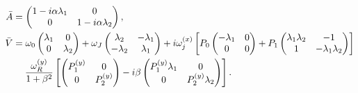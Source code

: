 \begin{subequations}
\begin{align}
    \bar{A} &=
    \begin{pmatrix}
     1-i\alpha\lambda_1 & 0 \\
     0 & 1-i\alpha\lambda_2
    \end{pmatrix}, \\
    \nonumber\bar{V} &=
    \omega_0\begin{pmatrix}
     \lambda_1 & 0 \\
     0 & \lambda_2
    \end{pmatrix}
    + \omega_J \begin{pmatrix}
     \lambda_2 & -\lambda_1 \\
     -\lambda_2 & \lambda_1
    \end{pmatrix}
    + i\omega_j^{(x)}\left[P_0
    \begin{pmatrix}
     -\lambda_1 & 0 \\
     0 & 0
    \end{pmatrix}
    + P_1
    \begin{pmatrix}
     \lambda_1\lambda_2 & -1 \\
     1 & -\lambda_1\lambda_2
    \end{pmatrix}\right] \\
    &\hspace{4.5mm} \frac{\omega_R^{(y)}}{1+\beta^2}\left[
    \begin{pmatrix}
     P_1^{(y)} & 0 \\
     0 & P_2^{(y)}
    \end{pmatrix}
    - i \beta
    \begin{pmatrix}
     P_1^{(y)}\lambda_1 & 0 \\
     0 & P_2^{(y)}\lambda_2
    \end{pmatrix}\right].
\end{align}
\end{subequations}

